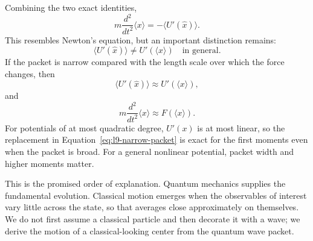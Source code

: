Combining the two exact identities,
\begin{equation}
  m\frac{d^2}{dt^2}\langle x\rangle
  =
  -\langle U'(\hat x)\rangle.
  \label{eq:l9-exact-Ehrenfest}
\end{equation}
This resembles Newton's equation, but an important distinction remains:
\begin{equation}
  \langle U'(\hat x)\rangle
  \neq
  U'(\langle x\rangle)
  \quad\text{in general}.
  \label{eq:l9-force-distinction}
\end{equation}
If the packet is narrow compared with the length scale over which the force
changes, then
\begin{equation}
  \langle U'(\hat x)\rangle
  \approx U'(\langle x\rangle),
  \label{eq:l9-narrow-packet}
\end{equation}
and
\begin{equation}
  m\frac{d^2}{dt^2}\langle x\rangle
  \approx F(\langle x\rangle).
  \label{eq:l9-classical-limit}
\end{equation}
For potentials of at most quadratic degree, \(U'(x)\) is at most linear, so
the replacement in Equation~\eqref{eq:l9-narrow-packet} is exact for the
first moments even when the packet is broad. For a general nonlinear
potential, packet width and higher moments matter.

\begin{classroomqa}
\end{classroomqa}

This is the promised order of explanation. Quantum mechanics supplies the
fundamental evolution. Classical motion emerges when the observables of
interest vary little across the state, so that averages close approximately
on themselves. We do not first assume a classical particle and then decorate
it with a wave; we derive the motion of a classical-looking center from the
quantum wave packet.

